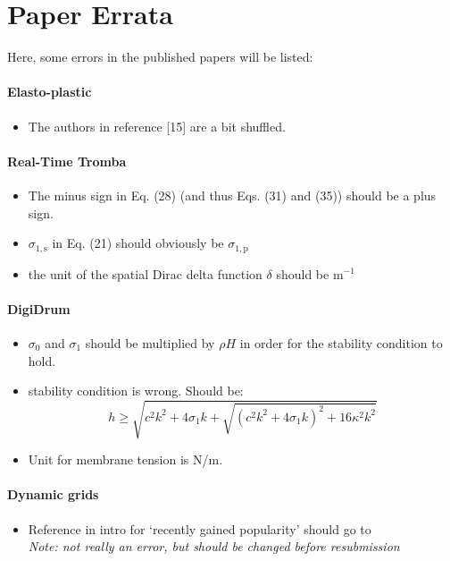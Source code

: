 \chapter*{Paper Errata}
Here, some errors in the published papers will be listed:
\\
\subsubsection{Elasto-plastic \citeP[C]}
\begin{itemize}
    \item The authors in reference [15] are a bit shuffled.
\end{itemize}
\subsubsection{Real-Time Tromba \citeP[D]}
\begin{itemize}
    \item The minus sign in Eq. (28) (and thus Eqs. (31) and (35)) should be a plus sign.
    \item $\sigma_{1,\text{s}}$ in Eq. (21) should obviously be $\sigma_{1,\text{p}}$
    \item the unit of the spatial Dirac delta function $\delta$ should be m$^{-1}$
\end{itemize}
%
\subsubsection{DigiDrum \citeP[F]}
\begin{itemize}
    \item $\sigma_0$ and $\sigma_1$ should be multiplied by $\rho H$ in order for the stability condition to hold.
    \item stability condition is wrong. Should be: 
    \begin{equation}
        h \geq \sqrt{c^2k^2 + 4\sigma_1k + \sqrt{(c^2k^2+4\sigma_1k)^2 + 16\kappa^2k^2}}
    \end{equation}
    \item Unit for membrane tension is N/m.
\end{itemize}
%
\subsubsection{Dynamic grids \citeP[G]}
\begin{itemize}
    \item Reference in intro for `recently gained popularity' should go to \cite{Bilbao2019CMJa} \\
    \textit{Note: not really an error, but should be changed before resubmission}
\end{itemize}